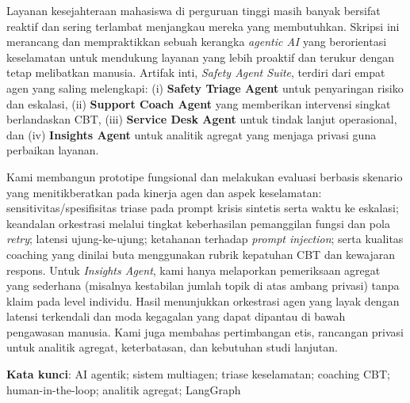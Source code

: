 \noindent
Layanan kesejahteraan mahasiswa di perguruan tinggi masih banyak bersifat reaktif dan sering terlambat menjangkau mereka yang membutuhkan. Skripsi ini merancang dan mempraktikkan sebuah kerangka \textit{agentic AI} yang berorientasi keselamatan untuk mendukung layanan yang lebih proaktif dan terukur dengan tetap melibatkan manusia. Artifak inti, \textit{Safety Agent Suite}, terdiri dari empat agen yang saling melengkapi: (i) \textbf{Safety Triage Agent} untuk penyaringan risiko dan eskalasi, (ii) \textbf{Support Coach Agent} yang memberikan intervensi singkat berlandaskan CBT, (iii) \textbf{Service Desk Agent} untuk tindak lanjut operasional, dan (iv) \textbf{Insights Agent} untuk analitik agregat yang menjaga privasi guna perbaikan layanan.

\noindent
Kami membangun prototipe fungsional dan melakukan evaluasi berbasis skenario yang menitikberatkan pada kinerja agen dan aspek keselamatan: sensitivitas/spesifisitas triase pada prompt krisis sintetis serta waktu ke eskalasi; keandalan orkestrasi melalui tingkat keberhasilan pemanggilan fungsi dan pola \textit{retry}; latensi ujung-ke-ujung; ketahanan terhadap \textit{prompt injection}; serta kualitas coaching yang dinilai buta menggunakan rubrik kepatuhan CBT dan kewajaran respons. Untuk \textit{Insights Agent}, kami hanya melaporkan pemeriksaan agregat yang sederhana (misalnya kestabilan jumlah topik di atas ambang privasi) tanpa klaim pada level individu. Hasil menunjukkan orkestrasi agen yang layak dengan latensi terkendali dan moda kegagalan yang dapat dipantau di bawah pengawasan manusia. Kami juga membahas pertimbangan etis, rancangan privasi untuk analitik agregat, keterbatasan, dan kebutuhan studi lanjutan.

\noindent\textbf{Kata kunci}: AI agentik; sistem multiagen; triase keselamatan; coaching CBT; human-in-the-loop; analitik agregat; LangGraph

